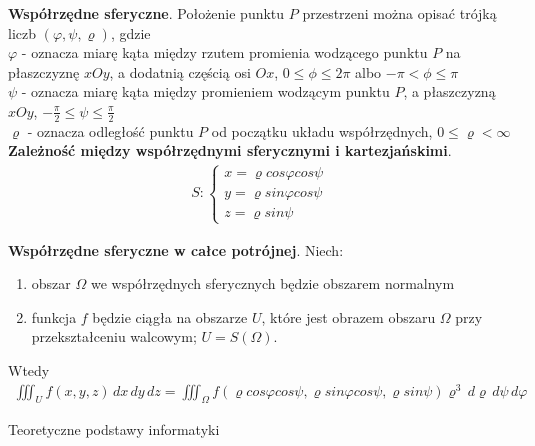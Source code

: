 \documentclass[12pt]{article}
\begin{document}
    \begin{definition}
        \textbf{Współrzędne sferyczne}. Położenie punktu $P$ przestrzeni można opisać trójką liczb $(\varphi, \psi, \varrho)$,
        gdzie\\

        $\varphi$ - oznacza miarę kąta między rzutem promienia wodzącego punktu $P$ na płaszczyznę $xOy$, a dodatnią częścią
        osi $Ox$, $0 \leq \phi \leq 2 \pi$ albo $-\pi < \phi \leq \pi$\\

        $\psi$ - oznacza miarę kąta między promieniem wodzącym punktu $P$, a płaszczyzną $xOy$, $-\frac{\pi}{2} \leq \psi \leq \frac{\pi}{2}$\\

        $\varrho$ - oznacza odległość punktu $P$ od początku układu współrzędnych, $0 \leq \varrho < \infty$\\

        \textbf{Zależność między współrzędnymi sferycznymi i kartezjańskimi}.
        \begin{align*}
            S: \begin{cases}
                   x = \varrho cos \varphi cos \psi \\
                   y = \varrho sin \varphi cos \psi \\
                   z = \varrho sin \psi
            \end{cases}
        \end{align*}

        \textbf{Współrzędne sferyczne w całce potrójnej}. Niech:
        \begin{enumerate}
            \item obszar $\Omega$ we współrzędnych sferycznych będzie obszarem normalnym
            \item funkcja $f$ będzie ciągła na obszarze  $U$, które jest obrazem obszaru $\Omega$ przy przekształceniu
            walcowym; $U = S(\Omega)$.
        \end{enumerate}
        Wtedy
        \begin{align*}
            \iiint_U f(x, y, z)\,dx\,dy\,dz = \iiint_{\Omega} f(\varrho cos \varphi cos \psi, \varrho sin \varphi cos \psi, \varrho sin \psi) \varrho^3\,d\varrho\,d\psi\,d\varphi
        \end{align*}
    \end{definition}

    \newpage

    \begin{center}
    {\LARGE Teoretyczne podstawy informatyki}
    \end{center}
\end{document}
